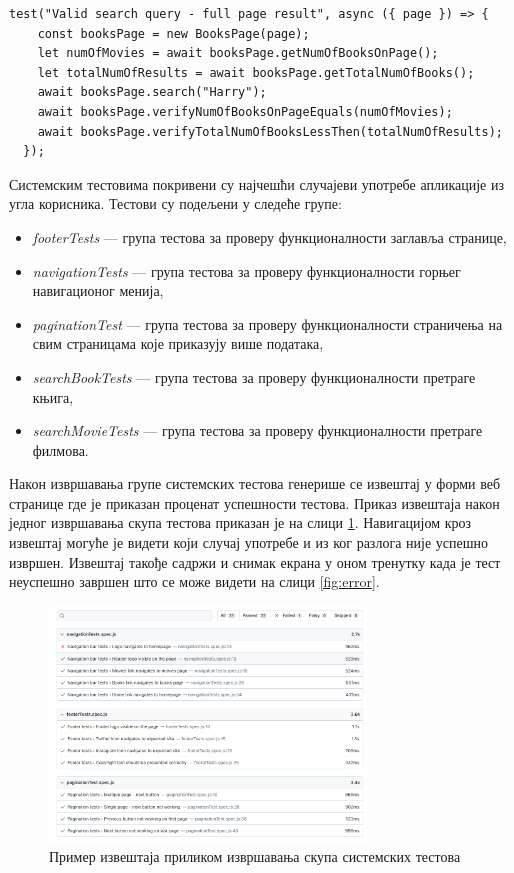\documentclass[12pt,oneside]{memoir}
\begin{document}
\begin{lstlisting}[caption=Тест случаја употребе --- претрага књига, 
label={lst:pretragaKnjiga},
frame=single]
 test("Valid search query - full page result", async ({ page }) => {
    const booksPage = new BooksPage(page);
    let numOfMovies = await booksPage.getNumOfBooksOnPage();
    let totalNumOfResults = await booksPage.getTotalNumOfBooks();
    await booksPage.search("Harry");
    await booksPage.verifyNumOfBooksOnPageEquals(numOfMovies);
    await booksPage.verifyTotalNumOfBooksLessThen(totalNumOfResults);
  });
\end{lstlisting}

Системским тестовима покривени су најчешћи случајеви употребе апликације из угла корисника. Тестови су подељени у следеће групе: \newpage
\begin{itemize}
\item \textit{footerTests} --- група тестова за проверу функционалности заглавља странице,
\item \textit{navigationTests} --- група тестова за проверу функционалности горњег навигационог менија,
\item \textit{paginationTest} --- група тестова за проверу функционалности страничења на свим страницама које приказују више података,
\item \textit{searchBookTests} --- група тестова за проверу функционалности претраге књига,
\item \textit{searchMovieTests} --- група тестова за проверу функционалности претраге филмова.
\end{itemize}

Након извршавања групе системских тестова генерише се извештај у форми веб странице где је приказан проценат успешности тестова. Приказ извештаја након једног извршавања скупа тестова приказан је на слици \ref{fig:e2e}. Навигацијом кроз извештај могуће је видети који случај употребе и из ког разлога није успешно извршен. Извештај такође садржи и снимак екрана у оном тренутку када је тест неуспешно завршен што се може видети на слици \ref{fig:error}.
 
 
 \begin{figure}[!ht]
  \centering
  \includegraphics[width=0.75\textwidth]{matfmaster/img/e2e.png}
  \caption{Пример извештаја приликом извршавања скупа системских тестова}
  \label{fig:e2e}
\end{figure}
\end{document}
